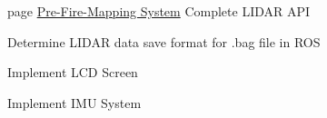 \label{todo__todo000001}
\hypertarget{todo__todo000001}{}
 
\begin{DoxyDescription}
\item[page \hyperlink{index}{Pre-\/Fire-\/Mapping System} ]Complete LIDAR API 

Determine LIDAR data save format for .bag file in ROS 

Implement LCD Screen 

Implement IMU System


\end{DoxyDescription}